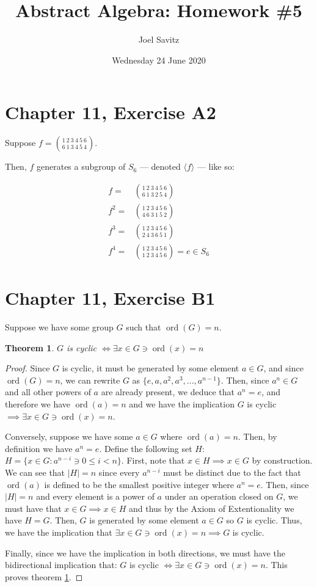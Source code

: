 \documentclass[12pt]{article}
\title{Abstract Algebra: Homework \#5}
\author{Joel Savitz}
\date{Wednesday 24 June 2020}
\newcommand{\ord}{\operatorname{ord}}
\newtheorem{thm}{Theorem}
\begin{document}
\maketitle

\section{Chapter 11, Exercise A2}

Suppose $f = \binom{1\ 2\ 3\ 4\ 5\ 6}{6\ 1\ 3\ 4\ 5\ 4}$.

Then, $f$ generates a subgroup of $S_6$
--- denoted $\langle f \rangle$ ---
like so:

\begin{align}
	f = & \binom{1\ 2\ 3\ 4\ 5\ 6}{6\ 1\ 3\ 2\ 5\ 4} \\
	f^2 = & \binom{1\ 2\ 3\ 4\ 5\ 6}{4\ 6\ 3\ 1\ 5\ 2} \\
	f^3 = & \binom{1\ 2\ 3\ 4\ 5\ 6}{2\ 4\ 3\ 6\ 5\ 1} \\
	f^4 = & \binom{1\ 2\ 3\ 4\ 5\ 6}{1\ 2\ 3\ 4\ 5\ 6} = e \in S_6
\end{align}

\section{Chapter 11, Exercise B1}

Suppose we have some group $G$ such that
$\ord(G) = n$.

\begin{thm} \label{thm1}
	$G$ is cyclic $\iff \exists x \in G \ni \ord(x) = n$	
\end{thm}

\begin{proof}
	Since $G$ is cyclic,
	it must be generated
	by some element $a \in G$,
	and since $\ord(G) = n$,
	we can rewrite $G$ as
	$\{e, a, a^2, a^3, ..., a^{n-1} \}$.
	Then, since $a^n \in G$ and all other
	powers of $a$ are already present,
	we deduce that $a^n = e$,
	and therefore we have $\ord(a) = n$
	and we have the implication
	$G$ is cyclic $\implies \exists x \in G \ni \ord(x) = n$.

	Conversely,
	suppose we have some $a \in G$
	where $\ord(a) = n$.
	Then, by definition
	we have $a^n = e$.
	Define the following set $H$:
	$H = \{x \in G: a^{n-i} \ni 0 \le i < n \}$.
	First, note that $x \in H \implies x \in G$ by construction.
	We can see that $|H| = n$
	since every $a^{n-i}$ must be distinct
	due to the fact that $\ord(a)$ is defined
	to be the smallest positive integer
	where $a^n = e$.
	Then, since $|H| = n$ and every element is a power
	of $a$ under an operation closed on $G$,
	we must have that $x \in G \implies x \in H$
	and thus by the Axiom of Extentionality
	we have $H = G$.
	Then, $G$ is generated by some element $a \in G$
	so $G$ is cyclic.
	Thus, we have
	the implication that
	$\exists x \in G \ni \ord(x) = n \implies G$ is cyclic.

	Finally, since we have the implication in both directions,
	we must have the bidirectional implication that:
	$G$ is cyclic $\iff \exists x \in G \ni \ord(x) = n$.
	This proves theorem \ref{thm1}.
\end{proof}
\end{document}
